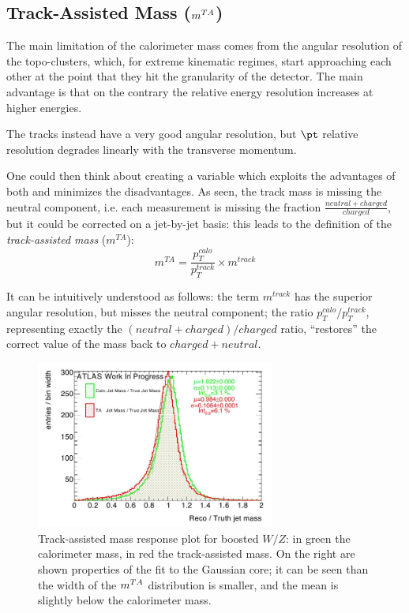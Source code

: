 
\subsection{Track-Assisted Mass ($\mta$)}
The main limitation of the calorimeter mass comes from the angular resolution of the topo-clusters, which, for extreme kinematic regimes, start approaching each other at the point that they hit the granularity of the detector. The main advantage is that on the contrary the relative energy resolution increases at higher energies.

The tracks instead have a very good angular resolution, but $\pt$ relative resolution degrades linearly with the transverse momentum. 

One could then think about creating a variable which exploits the advantages of both and minimizes the disadvantages. As seen, the track mass is missing the neutral component, i.e. each measurement is missing the fraction $\frac{neutral+charged}{charged}$, but it could be corrected on a jet-by-jet basis: this leads to the definition of the \textit{track-assisted mass} ($m^{TA}$):
\begin{equation}
 m^{TA}=\frac{p_T^{calo}}{p_T^{track}}\times m^{track}
\end{equation}

It can be intuitively understood as follows: the term $m^{track}$ has the superior angular resolution, but misses the neutral component; the ratio $p_T^{calo}/p_T^{track}$, representing exactly the $(neutral+charged)/charged$ ratio, ``restores'' the correct value of the mass back to $charged+neutral$.
\begin{figure}[!ht]
  \centering
      \includegraphics[width=0.7\textwidth]{jet_part/mta/allbinptmta.png}
  \caption[$\mcal$ and $\mta$ mass responses]{Track-assisted mass response plot for boosted $W/Z$: in green the calorimeter mass, in red the track-assisted mass. On the right are shown properties of the fit to the Gaussian core; it can be seen than the width of the $\mta$ distribution is smaller, and the mean is slightly below the calorimeter mass.}
  \label{fig:mta1}
\end{figure}

